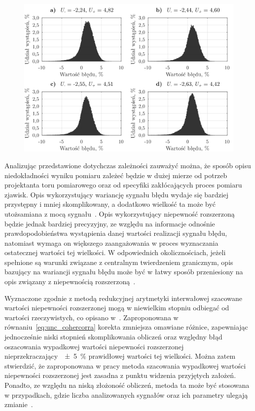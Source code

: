 \begin{figure}[htb!]
\begin{center}
\includegraphics{obrazki/hist_reductive}
\end{center}
\end{figure}

Analizując przedstawione dotychczas zależności zauważyć można, że sposób opisu niedokładności wyniku pomiaru zależeć będzie w dużej mierze od potrzeb projektanta toru pomiarowego oraz od specyfiki zakłócających proces pomiaru zjawisk. Opis wykorzystujący wariancję sygnału błędu wydaje się bardziej przystępny i mniej skomplikowany, a dodatkowo wielkość ta może być utożsamiana z mocą sygnału~\cite{proakis_dsp}. Opis wykorzystujący niepewność rozszerzoną będzie jednak bardziej precyzyjny, ze względu na informacje odnośnie prawdopodobieństwa wystąpienia danej wartości realizacji sygnału błędu, natomiast wymaga on większego zaangażowania w proces wyznaczania ostatecznej wartości tej wielkości. W odpowiednich okolicznościach, jeżeli spełnione są warunki związane z centralnym twierdzeniem granicznym, opis bazujący na wariancji sygnału błędu może być w łatwy sposób przeniesiony na opis związany z niepewnością rozszerzoną~\cite{jcgm_guide}.

Wyznaczone zgodnie z metodą redukcyjnej arytmetyki interwałowej szacowane wartości niepewności rozszerzonej mogą w niewielkim stopniu odbiegać od wartości rzeczywistych, co opisano w~\cite{jakubiec_redmono, jakubiec_model}. Zaproponowana w równaniu~\eqref{eq:unc_cohercorra} korekta zmniejsza omawiane różnice, zapewniając jednocześnie niski stopnień skomplikowania obliczeń oraz względny błąd oszacowania wypadkowej wartości niepewności rozszerzonej nieprzekraczający~\qty{\pm 5}{\percent} prawidłowej wartości tej wielkości. Można zatem stwierdzić, że zaproponowana w pracy metoda szacowania wypadkowej wartości niepewności rozszerzonej jest zasadna z punktu widzenia przyjętych założeń. Ponadto, ze względu na niską złożoność obliczeń, metoda ta może być stosowana w przypadkach, gdzie liczba analizowanych sygnałów oraz ich parametry ulegają zmianie~\cite{auth_reductive}.

